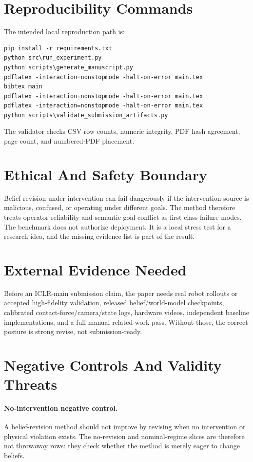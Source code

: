 \documentclass{article}
\begin{document}
\section{Reproducibility Commands}
The intended local reproduction path is:
\begin{verbatim}
pip install -r requirements.txt
python src\run_experiment.py
python scripts\generate_manuscript.py
pdflatex -interaction=nonstopmode -halt-on-error main.tex
bibtex main
pdflatex -interaction=nonstopmode -halt-on-error main.tex
pdflatex -interaction=nonstopmode -halt-on-error main.tex
python scripts\validate_submission_artifacts.py
\end{verbatim}
The validator checks CSV row counts, numeric integrity, PDF hash agreement, page count, and numbered-PDF placement.

\clearpage
\section{Ethical And Safety Boundary}
Belief revision under intervention can fail dangerously if the intervention source is malicious, confused, or operating under different goals. The method therefore treats operator reliability and semantic-goal conflict as first-class failure modes. The benchmark does not authorize deployment. It is a local stress test for a research idea, and the missing evidence list is part of the result.

\section{External Evidence Needed}
Before an ICLR-main submission claim, the paper needs real robot rollouts or accepted high-fidelity validation, released belief/world-model checkpoints, calibrated contact-force/camera/state logs, hardware videos, independent baseline implementations, and a full manual related-work pass. Without those, the correct posture is strong revise, not submission-ready.

\clearpage
\section{Negative Controls And Validity Threats}
\paragraph{No-intervention negative control.} A belief-revision method should not improve by revising when no intervention or physical violation exists. The no-revision and nominal-regime slices are therefore not throwaway rows: they check whether the method is merely eager to change beliefs.
\end{document}
